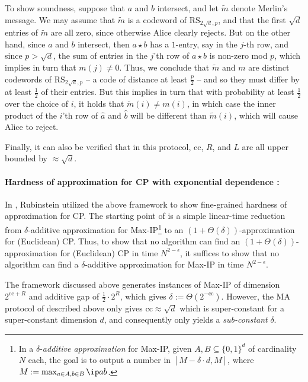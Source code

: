 \documentclass[11pt]{article}
\theoremstyle{plain}
\theoremstyle{remark}
\newcommand{\cc}{\mathrm{cc}}
\begin{document}
To show soundness, suppose that $a$ and $b$ intersect, and let $\tilde m$ denote Merlin's message. We may assume that $\tilde m$ is a codeword of $\mathrm{RS}_{2\sqrt{d},p}$, and that the first $\sqrt{d}$ entries of $\tilde m$ are all zero, since otherwise Alice clearly rejects. But on the other hand, since $a$ and $b$ intersect, then $a \star b$ has a $1$-entry, say in the $j$-th row, and since $p>\sqrt{d}$, the sum of entries in the $j$'th row of $a \star b$ is non-zero mod $p$, which implies in turn that $m(j) \neq 0$. Thus, we conclude that $\tilde m$ and $m$ are distinct codewords of $\mathrm{RS}_{2\sqrt{d},p}$ -- a code of distance at least $\frac p 2$ -- and so they must differ by at least $\frac 1 2$ of their entries. But this implies in turn that with probability at least $\frac 1 2$ over the choice of $i$, it holds that 
$\tilde m(i)\neq m(i)$, in which case the inner product of the $i$'th row of $\hat a$ and $\hat b$ will be different than $\tilde m(i)$, which will cause Alice to reject.

Finally, it can also be verified that in this protocol, $\cc$, $R$, and $L$ are all upper bounded by $\approx \sqrt{d}$. 


\paragraph{Hardness of approximation for CP with exponential dependence \cite{Rub18}:}

In \cite{Rub18}, Rubinstein utilized the above framework to show fine-grained hardness of approximation for CP. 
The starting point of \cite{Rub18}  is a simple linear-time reduction
from $\delta$-additive approximation for Max-IP\footnote{In a $\delta$-\emph{additive approximation} for Max-IP, given $A, B\subseteq\{0,1\}^d$ of cardinality $N$ each, the goal is to output a number in $[M - \delta \cdot d, M]$, where $M:=\max_{a \in A, b \in B} \ip a b$.}  to an $(1+\Theta(\delta))$-approximation for (Euclidean) CP. Thus, to show that no algorithm can find an $(1+\Theta(\delta))$-approximation for (Euclidean) CP in time $N^{2-\epsilon}$, it suffices to show that no algorithm can find a $\delta$-additive approximation for Max-IP in time $N^{2-\epsilon}$. 

The \cite{ARW17} framework discussed above generates instances of Max-IP of dimension $2^{\cc+R}$ and additive gap  of $\frac 1 2\cdot 2^R$, which gives $\delta:=\Theta(2^{-\cc})$. However, the MA protocol of \cite{AW09} described above only gives $\cc \approx \sqrt{d} $ which is super-constant for a super-constant dimension $d$, and consequently only yields a \emph{sub-constant} $\delta$.
\end{document}
